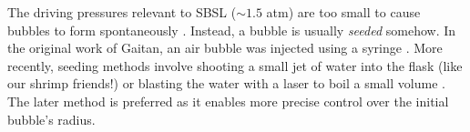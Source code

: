 \documentclass[11pt,prb,aps,nofootinbib,superscriptaddress,floatfix]{revtex4-2}
\begin{document}


The driving pressures relevant to SBSL ($\sim 1.5$ atm) are too small to cause bubbles to form spontaneously \cite{brenner2002single}. Instead, a bubble is usually \emph{seeded} somehow. In the original work of Gaitan, an air bubble was injected using a syringe \cite{gaitan1992sonoluminescence}. More recently, seeding methods involve shooting a small jet of water into the flask (like our shrimp friends!) or blasting the water with a laser to boil a small volume \cite{suslick2008inside,yasui2018acoustic}. The later method is preferred as it enables more precise control over the initial bubble's radius. 
\end{document}
